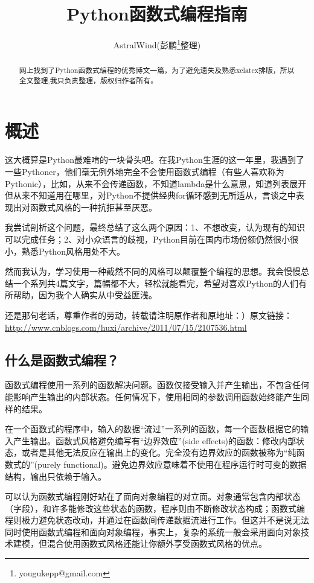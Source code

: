 \documentclass[12pt,a4paper]{report}
\title{Python函数式编程指南}
\author{AstralWind(彭鹏\footnote{yougukepp@gmail.com}整理)}
\begin{document}
\maketitle
\tableofcontents

\begin{abstract}
网上找到了Python函数式编程的优秀博文一篇，为了避免遗失及熟悉xelatex排版，所以全文整理,我只负责整理，版权归作者所有。
\end{abstract}

\chapter{概述}
这大概算是Python最难啃的一块骨头吧。在我Python生涯的这一年里，我遇到了一些Pythoner，他们毫无例外地完全不会使用函数式编程（有些人喜欢称为Pythonic），比如，从来不会传递函数，不知道lambda是什么意思，知道列表展开但从来不知道用在哪里，对Python不提供经典for循环感到无所适从，言谈之中表现出对函数式风格的一种抗拒甚至厌恶。 

我尝试剖析这个问题，最终总结了这么两个原因：1、不想改变，认为现有的知识可以完成任务；2、对小众语言的歧视，Python目前在国内市场份额仍然很小很小，熟悉Python风格用处不大。 

然而我认为，学习使用一种截然不同的风格可以颠覆整个编程的思想。我会慢慢总结一个系列共4篇文字，篇幅都不大，轻松就能看完，希望对喜欢Python的人们有所帮助，因为我个人确实从中受益匪浅。 

还是那句老话，尊重作者的劳动，转载请注明原作者和原地址：）原文链接：\url{http://www.cnblogs.com/huxi/archive/2011/07/15/2107536.html}
\section{什么是函数式编程？} 
函数式编程使用一系列的函数解决问题。函数仅接受输入并产生输出，不包含任何能影响产生输出的内部状态。任何情况下，使用相同的参数调用函数始终能产生同样的结果。

在一个函数式的程序中，输入的数据“流过”一系列的函数，每一个函数根据它的输入产生输出。函数式风格避免编写有“边界效应”(side effects)的函数：修改内部状态，或者是其他无法反应在输出上的变化。完全没有边界效应的函数被称为“纯函数式的”(purely functional)。避免边界效应意味着不使用在程序运行时可变的数据结构，输出只依赖于输入。

可以认为函数式编程刚好站在了面向对象编程的对立面。对象通常包含内部状态（字段），和许多能修改这些状态的函数，程序则由不断修改状态构成；函数式编程则极力避免状态改动，并通过在函数间传递数据流进行工作。但这并不是说无法同时使用函数式编程和面向对象编程，事实上，复杂的系统一般会采用面向对象技术建模，但混合使用函数式风格还能让你额外享受函数式风格的优点。
\end{document}
